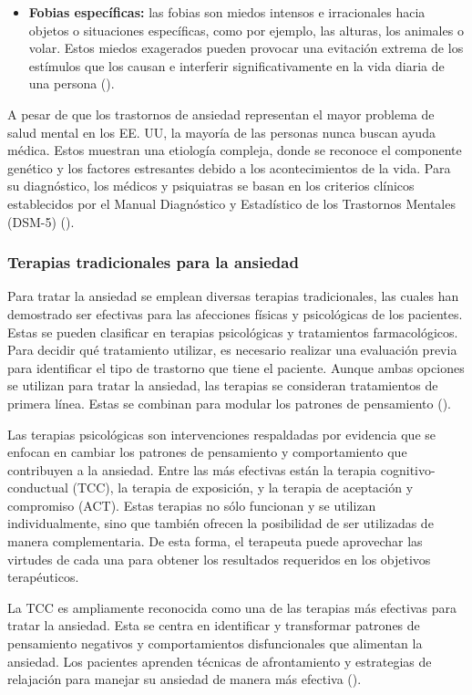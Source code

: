 \begin{itemize}
	\item \textbf{Fobias específicas:} las fobias son miedos intensos e irracionales hacia objetos o situaciones específicas, como por ejemplo, las alturas, los animales o volar. Estos miedos exagerados pueden provocar una evitación extrema de los estímulos que los causan e interferir significativamente en la vida diaria de una persona (\cite{APA:2013}).
\end{itemize}

A pesar de que los trastornos de ansiedad representan el mayor problema de salud mental en los EE. UU, la mayoría de las personas nunca buscan ayuda médica. Estos muestran una etiología compleja, donde se reconoce el componente genético y los factores estresantes debido a los acontecimientos de la vida. Para su diagnóstico, los médicos y psiquiatras se basan en los criterios clínicos establecidos por el Manual Diagnóstico
y Estadístico de los Trastornos Mentales (DSM-5) (\cite{DELGADO:2021}).

\subsubsection{Terapias tradicionales para la ansiedad}

Para tratar la ansiedad se emplean diversas terapias tradicionales, las cuales han demostrado ser efectivas para las afecciones físicas y psicológicas de los pacientes. Estas se pueden clasificar en terapias psicológicas y tratamientos farmacológicos. Para decidir qué tratamiento utilizar, es necesario realizar una evaluación previa para identificar el tipo de trastorno que tiene el paciente. Aunque ambas opciones se utilizan para tratar la ansiedad, las terapias se consideran tratamientos de primera línea. Estas se combinan para modular los patrones de pensamiento (\cite{DELGADO:2021}).

Las terapias psicológicas son intervenciones respaldadas por evidencia que se enfocan en cambiar los patrones de pensamiento y comportamiento que contribuyen a la ansiedad. Entre las más efectivas están la terapia cognitivo-conductual (TCC), la terapia de exposición, y la terapia de aceptación y compromiso (ACT). Estas terapias no sólo funcionan y se utilizan individualmente, sino que también ofrecen la posibilidad de ser utilizadas de manera complementaria. De esta forma, el terapeuta puede aprovechar las virtudes de cada una para obtener los resultados requeridos en los objetivos terapéuticos.

La TCC es ampliamente reconocida como una de las terapias más efectivas para tratar la ansiedad. Esta se centra en identificar y transformar patrones de pensamiento negativos y comportamientos disfuncionales que alimentan la ansiedad. Los pacientes aprenden técnicas de afrontamiento y estrategias de relajación para manejar su ansiedad de manera más efectiva (\cite{HOFMANN:2012}).

